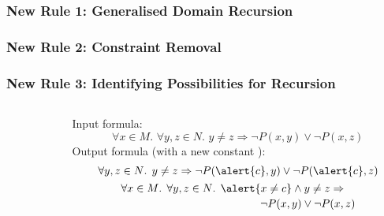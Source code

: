 \documentclass{beamer}
\begin{document}
\begin{frame}
  \frametitle<1>{New Rule 1: Generalised Domain Recursion}
  \frametitle<2>{New Rule 2: Constraint Removal}
  \frametitle<3>{New Rule 3: Identifying Possibilities for Recursion}
  \begin{columns}
    \begin{column}{0.15\textwidth}
      \centering
    \end{column}
    \begin{column}{0.85\textwidth}
      \begin{overprint}
          \begin{example}
            Input formula:
            \[
              \forall x \in M\text{. }\forall y, z \in N\text{. }y \ne z \Rightarrow \neg P(x, y) \lor \neg P(x, z)
            \]
            Output formula (with a new constant ):
            \begin{gather*}
              \forall y, z \in N\text{. }y \ne z \Rightarrow \neg P(\alert{c}, y) \lor \neg P(\alert{c}, z) \\
              \begin{multlined}
                \forall x \in M\text{. }\forall y, z \in N\text{. }\alert{x \ne c} \land y \ne z \Rightarrow \\
                \neg P(x, y) \lor \neg P(x, z)
              \end{multlined}
            \end{gather*}
          \end{example}

\end{overprint}
\end{column}
\end{columns}
\end{frame}
\end{document}
